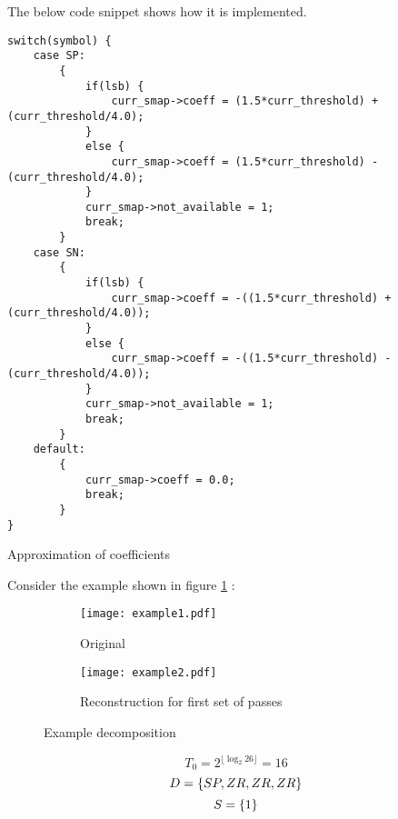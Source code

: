\documentclass[./A14_Report.tex]{subfiles}
\begin{document}
The below code snippet shows how it is implemented.

\begin{code}
\begin{verbatim}
switch(symbol) {
    case SP:
        {
            if(lsb) {
                curr_smap->coeff = (1.5*curr_threshold) + (curr_threshold/4.0);
            }
            else {
                curr_smap->coeff = (1.5*curr_threshold) - (curr_threshold/4.0);
            }
            curr_smap->not_available = 1;
            break;
        }
    case SN:
        {
            if(lsb) {
                curr_smap->coeff = -((1.5*curr_threshold) + (curr_threshold/4.0));
            }
            else {
                curr_smap->coeff = -((1.5*curr_threshold) - (curr_threshold/4.0));
            }
            curr_smap->not_available = 1;
            break;
        }
    default:
        {
            curr_smap->coeff = 0.0;
            break;
        }
}
\end{verbatim}
\caption{Approximation of coefficients \cite{libezw}}
    \label{code:sbtreedef}
\end{code}
\vspace{0.5cm}

Consider the example shown in figure \ref{fig:exa}
\cite{sayood_datac}:

\begin{figure}[H]
    \begin{subfigure}[b]{0.5\textwidth}
        \centering
        \texttt{[image: example1.pdf]}
        \caption{Original}
        \label{fig:exa}
    \end{subfigure}
    \hfill
    \begin{subfigure}[b]{0.5\textwidth}
        \centering
        \texttt{[image: example2.pdf]}
        \caption{Reconstruction for first set of passes}
        \label{fig:exb}
    \end{subfigure}
    \caption{Example decomposition}
    \label{fig:ex}
\end{figure}

\begin{displaymath}
    T_0 = 2^{\lfloor\log_2{26}\rfloor} = 16
\end{displaymath}
\begin{displaymath}
    D = \{SP, ZR, ZR, ZR\}\\
\end{displaymath}
\begin{displaymath}
    S = \{1\}\\
\end{displaymath}
\end{document}
